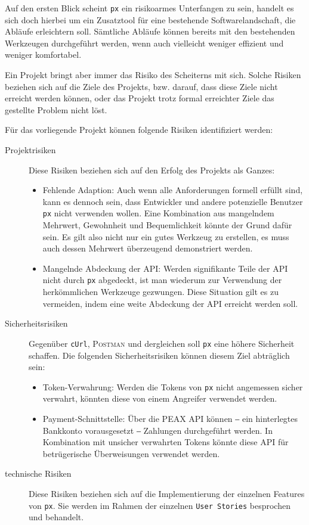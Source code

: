 Auf den ersten Blick scheint \texttt{px} ein risikoarmes Unterfangen zu sein, handelt es sich doch hierbei um ein Zusatztool für eine bestehende Softwarelandschaft, die Abläufe erleichtern soll. Sämtliche Abläufe können bereits mit den bestehenden Werkzeugen durchgeführt werden, wenn auch vielleicht weniger effizient und weniger komfortabel.

Ein Projekt bringt aber immer das Risiko des Scheiterns mit sich. Solche Risiken beziehen sich auf die Ziele des Projekts, bzw. darauf, dass diese Ziele nicht erreicht werden können, oder das Projekt trotz formal erreichter Ziele das gestellte Problem nicht löst.

Für das vorliegende Projekt können folgende Risiken identifiziert werden:

\begin{description}
    \item[Projektrisiken] Diese Risiken beziehen sich auf den Erfolg des Projekts als Ganzes:
        \begin{itemize}
            \item Fehlende Adaption: Auch wenn alle Anforderungen formell erfüllt sind, kann es dennoch sein, dass Entwickler und andere potenzielle Benutzer \texttt{px} nicht verwenden wollen. Eine Kombination aus mangelndem Mehrwert, Gewohnheit und Bequemlichkeit könnte der Grund dafür sein. Es gilt also nicht nur ein gutes Werkzeug zu erstellen, es muss auch dessen Mehrwert überzeugend demonstriert werden.
            \item Mangelnde Abdeckung der API: Werden signifikante Teile der API nicht durch \texttt{px} abgedeckt, ist man wiederum zur Verwendung der herkömmlichen Werkzeuge gezwungen. Diese Situation gilt es zu vermeiden, indem eine weite Abdeckung der API erreicht werden soll.
        \end{itemize}
    \item[Sicherheitsrisiken] Gegenüber \texttt{cUrl}, \textsc{Postman} und dergleichen soll \texttt{px} eine höhere Sicherheit schaffen. Die folgenden Sicherheitsrisiken können diesem Ziel abträglich sein:
        \begin{itemize}
            \item Token-Verwahrung: Werden die Tokens von \texttt{px} nicht angemessen sicher verwahrt, könnten diese von einem Angreifer verwendet werden.
            \item Payment-Schnittstelle: Über die PEAX API können ‒ ein hinterlegtes Bankkonto vorausgesetzt ‒ Zahlungen durchgeführt werden. In Kombination mit unsicher verwahrten Tokens könnte diese API für betrügerische Überweisungen verwendet werden.
        \end{itemize}
    \item[technische Risiken] Diese Risiken beziehen sich auf die Implementierung der einzelnen Features von \texttt{px}. Sie werden im Rahmen der einzelnen \texttt{User Stories} besprochen und behandelt.
\end{description}
